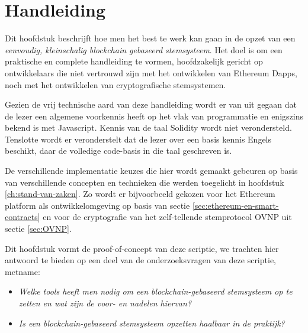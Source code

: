 

\chapter{Handleiding}
\label{ch:handleiding}

Dit hoofdstuk beschrijft hoe men het best te werk kan gaan in de opzet van een \textit{eenvoudig, kleinschalig blockchain gebaseerd stemsysteem}. Het doel is om een praktische en complete handleiding te vormen, hoofdzakelijk gericht op ontwikkelaars die niet vertrouwd zijn met het ontwikkelen van Ethereum Dapps, noch met het ontwikkelen van cryptografische stemsystemen. 

Gezien de vrij technische aard van deze handleiding wordt er van uit gegaan dat de lezer een algemene voorkennis heeft op het vlak van programmatie en enigszins bekend is met Javascript. Kennis van de taal Solidity wordt niet verondersteld. Tenslotte wordt er veronderstelt dat de lezer over een basis kennis Engels beschikt, daar de volledige code-basis in die taal geschreven is. 

De  verschillende implementatie keuzes die hier wordt gemaakt gebeuren op basis van verschillende concepten en technieken die werden toegelicht in hoofdstuk \ref{ch:stand-van-zaken}. Zo wordt er bijvoorbeeld gekozen voor het Ethereum platform als ontwikkelomgeving op basis van sectie \ref{sec:ethereum-en-smart-contracts} en voor de cryptografie van het zelf-tellende stemprotocol OVNP \autocite{McCorry2017} uit sectie \ref{sec:OVNP}.

Dit hoofdstuk vormt de proof-of-concept van deze scriptie, we trachten hier antwoord te bieden op een deel van de onderzoeksvragen van deze scriptie, metname: 
\begin{itemize}
	\item \textit{Welke tools heeft men nodig om een blockchain-gebaseerd stemsysteem op te zetten en wat zijn de voor- en nadelen hiervan?}
	\item \textit{Is een blockchain-gebaseerd stemsysteem opzetten haalbaar in de praktijk?} 
\end{itemize}

